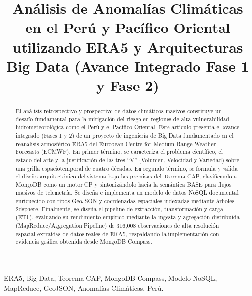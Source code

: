 \documentclass[conference]{IEEEtran}
\begin{document}
\title{Análisis de Anomalías Climáticas en el Perú y Pacífico Oriental utilizando ERA5 y Arquitecturas Big Data (Avance Integrado Fase 1 y Fase 2)}

\author{
}

\maketitle

\begin{abstract}
El análisis retrospectivo y prospectivo de datos climáticos masivos constituye un desafío fundamental para la mitigación del riesgo en regiones de alta vulnerabilidad hidrometeorológica como el Perú y el Pacífico Oriental. Este artículo presenta el avance integrado (Fases 1 y 2) de un proyecto de ingeniería de Big Data fundamentado en el reanálisis atmosférico ERA5 del European Centre for Medium-Range Weather Forecasts (ECMWF). En primer término, se caracteriza el problema científico, el estado del arte y la justificación de las tres ``V'' (Volumen, Velocidad y Variedad) sobre una grilla espaciotemporal de cuatro décadas. En segundo término, se formula y valida el diseño arquitectónico del sistema bajo las premisas del Teorema CAP, clasificando a MongoDB como un motor CP y sintonizándolo hacia la semántica BASE para flujos masivos de telemetría. Se diseña e implementa un modelo de datos NoSQL documental enriquecido con tipos GeoJSON y coordenadas espaciales indexadas mediante árboles 2dsphere. Finalmente, se diseña el pipeline de extracción, transformación y carga (ETL), evaluando su rendimiento empírico mediante la ingesta y agregación distribuida (MapReduce/Aggregation Pipeline) de 316,008 observaciones de alta resolución espacial extraídas de datos reales de ERA5, respaldando la implementación con evidencia gráfica obtenida desde MongoDB Compass.
\end{abstract}

\begin{IEEEkeywords}
ERA5, Big Data, Teorema CAP, MongoDB Compass, Modelo NoSQL, MapReduce, GeoJSON, Anomalías Climáticas, Perú.
\end{IEEEkeywords}
\end{document}
